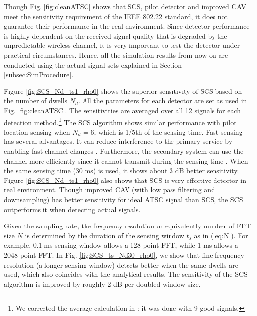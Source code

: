 \documentclass[draftclsnofoot,onecolumn,12pt]{IEEEtran}
\begin{document}
Though Fig. \ref{fig:cleanATSC} shows that SCS, pilot detector and improved CAV meet the sensitivity requirement of the IEEE 802.22 standard, it does not guarantee their performance in the real environment.
Since detector performance is highly dependent on the received signal quality that is degraded by the unpredictable wireless channel, it is very important to test the detector under practical circumstances.
Hence, all the simulation results from now on are conducted using the actual signal sets explained in Section \ref{subsec:SimProcedure}.

Figure \ref{fig:SCS_Nd_ts1_rho0} shows the superior sensitivity of SCS based on the number of dwells $N_d$.
All the parameters for each detector are set as used in Fig. \ref{fig:cleanATSC}.
The sensitivities are averaged over all 12 signals for each detection method.\footnote{We corrected the average calculation in \cite{CorGho07}: it was done with 9 good signals.}
The SCS algorithm shows similar performance with pilot location sensing when $N_d$ = 6, which is 1/5th of the sensing time.
Fast sensing has several advantages. It can reduce interference to the primary service by enabling fast channel changes \cite{YucArs09}.
Furthermore, the secondary system can use the channel more efficiently since it cannot transmit during the sensing time \cite{CorCha06}.
When the same sensing time (30 ms) is used, it shows about 3 dB better sensitivity.
Figure \ref{fig:SCS_Nd_ts1_rho0} also shows that SCS is very effective detector in real environment. Though improved CAV (with low pass filtering and downsampling) has better sensitivity for ideal ATSC signal than SCS, the SCS outperforms it when detecting actual signals.



Given the sampling rate, the frequency resolution or equivalently number of FFT size $N$ is determined
by the duration of the sensing window $t_s$ as in (\ref{eq:N}). For example, 0.1 ms sensing window allows
a 128-point FFT, while 1 ms allows a 2048-point FFT. In Fig. \ref{fig:SCS_ts_Nd30_rho0}, we show
that fine frequency resolution (a longer sensing window) detects better when the same dwells are
used, which also coincides with the analytical results.
The sensitivity of the SCS algorithm is improved by roughly 2 dB per doubled window size.
\end{document}
